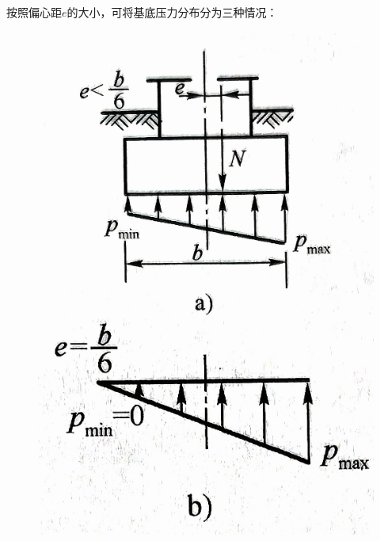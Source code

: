 \documentclass[12pt,a4paper]{ctexart}
\begin{document}
	按照偏心距$e$的大小，可将基底压力分布分为三种情况：
	\begin{figure}[H]
		\centering
		\begin{minipage}[c]{0.3\textwidth}
			\centering
			\includegraphics[width=1.1\textwidth]{a}
		\end{minipage}
		\begin{minipage}[c]{0.3\textwidth}
			\centering
			\includegraphics[width=1.1\textwidth]{b}
		\end{minipage}
	\end{figure}
\end{document}
